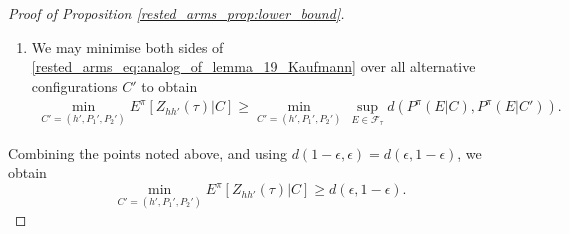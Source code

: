 \begin{proof}[Proof of Proposition \ref{rested_arms_prop:lower_bound}]
\begin{enumerate}
	\item We may minimise both sides of \eqref{rested_arms_eq:analog_of_lemma_19_Kaufmann} over all alternative configurations $C'$ to obtain
	\begingroup\allowdisplaybreaks\begin{align}
		\min\limits_{C'=(h',P_1',P_2')}E^\pi[Z_{hh'}(\tau)|C]
		\geq \min\limits_{C'=(h',P_1',P_2')}\,\sup\limits_{E\in \mathcal{F}_{\tau}}d(P^\pi(E|C),P^\pi(E|C')).\label{rested_arms_eq:analog_of_lemma_19_Kaufmann_min_over_all_C'}
	\end{align}\endgroup
\end{enumerate}

Combining the points noted above, and using $d(1-\epsilon,\epsilon)=d(\epsilon,1-\epsilon)$, we obtain
\begin{equation}
\min\limits_{C'=(h',P_1',P_2')}{E}^\pi[Z_{hh'}(\tau)|C]\geq d(\epsilon,1-\epsilon).\label{rested_arms_eq:lower_bound_partial_1}
\end{equation}


\end{proof}
